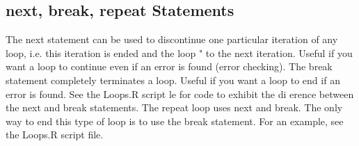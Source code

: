 \subsection*{next, break, repeat Statements}
The next statement can be used to discontinue one particular
iteration of any loop, i.e. this iteration is ended and the loop
\skips" to the next iteration. Useful if you want a loop to continue
even if an error is found (error checking).
The break statement completely terminates a loop. Useful if you
want a loop to end if an error is found. See the Loops.R script le
for code to exhibit the di erence between the next and break
statements.
The repeat loop uses next and break. The only way to end this
type of loop is to use the break statement. For an example, see
the Loops.R script file.

